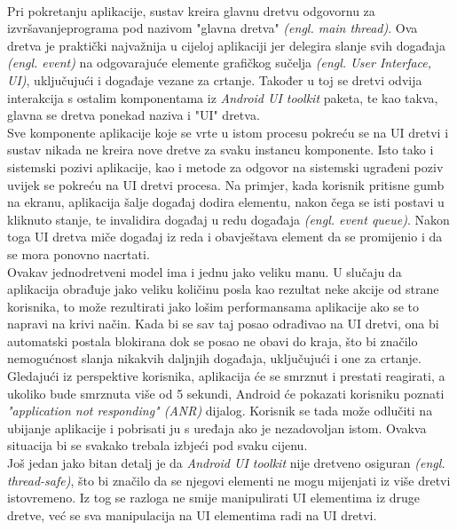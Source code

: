 \documentclass[times, utf8, zavrsni]{fer}
\begin{document}
\paragraph{}
Pri pokretanju aplikacije, sustav kreira glavnu dretvu odgovornu za izvršavanje\linebreak programa pod nazivom "glavna dretva" \textit{(engl. main thread)}. Ova dretva je praktički najvažnija u cijeloj aplikaciji jer delegira slanje svih događaja \textit{(engl. event)} na odgovarajuće elemente grafičkog sučelja \textit{(engl. User Interface, UI)}, uključujući i događaje vezane za crtanje. Također u toj se dretvi odvija interakcija s ostalim komponentama iz \textit{Android UI toolkit} paketa, te kao takva, glavna se dretva ponekad naziva i "UI" dretva.\\

Sve komponente aplikacije koje se vrte u istom procesu pokreću se na UI dretvi i sustav nikada ne kreira nove dretve za svaku instancu komponente. Isto tako i sistemski pozivi aplikacije, kao i metode za odgovor na sistemski ugrađeni poziv uvijek se pokreću na UI dretvi procesa. Na primjer, kada korisnik pritisne gumb na ekranu, aplikacija šalje događaj dodira elementu, nakon čega se isti postavi u kliknuto stanje, te invalidira događaj u redu događaja \textit{(engl. event queue)}. Nakon toga UI dretva miče događaj iz reda i obavještava element da se promijenio i da se mora ponovno nacrtati.\\

Ovakav jednodretveni model ima i jednu jako veliku manu. U slučaju da aplikacija obrađuje jako veliku količinu posla kao rezultat neke akcije od strane korisnika, to može rezultirati jako lošim performansama aplikacije ako se to napravi na krivi način. Kada bi se sav taj posao odrađivao na UI dretvi, ona bi automatski postala blokirana dok se posao ne obavi do kraja, što bi značilo nemogućnost slanja nikakvih daljnjih događaja, uključujući i one za crtanje. Gledajući iz perspektive korisnika, aplikacija će se smrznut i prestati reagirati, a ukoliko bude smrznuta više od 5 sekundi, Android će pokazati korisniku poznati \textit{"application not responding" (ANR)} dijalog. Korisnik se tada može odlučiti na ubijanje aplikacije i pobrisati ju s uređaja ako je nezadovoljan istom. Ovakva situacija bi se svakako trebala izbjeći pod svaku cijenu.\\

Još jedan jako bitan detalj je da \textit{Android UI toolkit} nije dretveno osiguran \textit{(engl. thread-safe)}, što bi značilo da se njegovi elementi ne mogu mijenjati iz više dretvi istovremeno. Iz tog se razloga ne smije manipulirati UI elementima iz druge dretve, već se sva manipulacija na UI elementima radi na UI dretvi.\\
\end{document}
